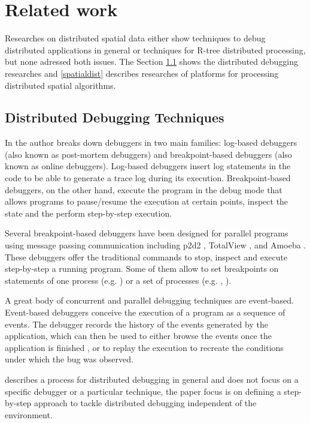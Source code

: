 \section{Related work}
\label{sec:related}

Researches on distributed spatial data either show techniques to debug distributed applications in general or techniques for R-tree distributed processing, 
but none adressed both issues.
The Section \ref{dist_debug} shows the distributed debugging researches and \ref{spatialdist} describes researches of platforms for processing distributed spatial algorithms.
	
\subsection{Distributed Debugging Techniques}
\label{dist_debug}

In \cite{remeD2011} the author breaks down debuggers in two main families: log-based debuggers (also known as post-mortem debuggers) and breakpoint-based debuggers 
(also known as online debuggers). 
Log-based debuggers insert log statements in the code to be able to generate a trace log during its execution. 
Breakpoint-based debuggers, on the other hand, execute the program in the debug mode that allows programs to pause/resume the execution at certain points, 
inspect the state and the perform step-by-step execution. 

Several breakpoint-based debuggers have been designed for parallel programs using message passing communication including p2d2 \cite{p2d21996}, TotalView \cite{totalView2009}, and Amoeba \cite{amoeba1989}. 
These debuggers offer the traditional commands to stop, inspect and execute step-by-step a running program. 
Some of them allow to set breakpoints on statements of one process (e.g. \cite{totalView2009}) or a set of processes (e.g. \cite{p2d21996}, \cite{amoeba1989}). 

A great body of concurrent and parallel debugging techniques are event-based. 
Event-based debuggers \cite{mcdowell1989Debugging} conceive the execution of a program as a sequence of events. 
The debugger records the history of the events generated by the application, which can then be used to either browse the events once the application is finished \cite{xtrace2007,causeway2009}, 
or to replay the execution to recreate the conditions under which the bug was observed. 
 
\cite{cheung1990Framework} describes a process for distributed debugging in general and does not focus on a specific debugger or a particular technique, 
the paper focus is on defining a step-by-step approach to tackle distributed debugging independent of the environment. 
	
